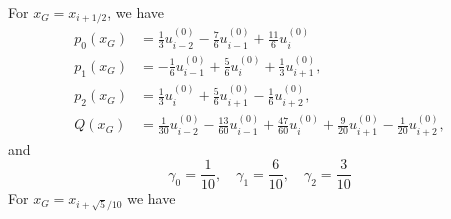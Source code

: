 \documentclass{book}
\begin{document}

For $x_{G}=x_{i+1 / 2}$, we have
\begin{equation}
    \begin{aligned}
        p_{0}\left(x_{G}\right) & =\frac{1}{3} u_{i-2}^{(0)}-\frac{7}{6} u_{i-1}^{(0)}+\frac{11}{6} u_{i}^{(0)}                                                            \\
        p_{1}\left(x_{G}\right) & =-\frac{1}{6} u_{i-1}^{(0)}+\frac{5}{6} u_{i}^{(0)}+\frac{1}{3} u_{i+1}^{(0)},                                                           \\
        p_{2}\left(x_{G}\right) & =\frac{1}{3} u_{i}^{(0)}+\frac{5}{6} u_{i+1}^{(0)}-\frac{1}{6} u_{i+2}^{(0)},                                                            \\
        Q\left(x_{G}\right)     & =\frac{1}{30} u_{i-2}^{(0)}-\frac{13}{60} u_{i-1}^{(0)}+\frac{47}{60} u_{i}^{(0)}+\frac{9}{20} u_{i+1}^{(0)}-\frac{1}{20} u_{i+2}^{(0)},
    \end{aligned}
\end{equation}
and
\begin{equation}
    \gamma_{0}=\frac{1}{10}, \quad \gamma_{1}=\frac{6}{10}, \quad \gamma_{2}=\frac{3}{10}
\end{equation}
For  $x_{G}=x_{i+\sqrt{5} / 10}$  we have
\end{document}
